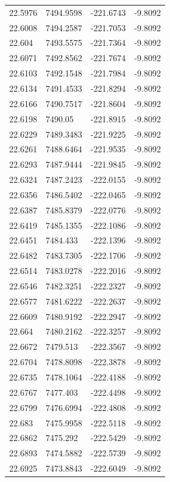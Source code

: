 \begin{table}[H]
\begin{tabular}{llll}
22.5976 & 7494.9598 & -221.6743 & -9.8092 \\
22.6008 & 7494.2587 & -221.7053 & -9.8092 \\
22.604 & 7493.5575 & -221.7364 & -9.8092 \\
22.6071 & 7492.8562 & -221.7674 & -9.8092 \\
22.6103 & 7492.1548 & -221.7984 & -9.8092 \\
22.6134 & 7491.4533 & -221.8294 & -9.8092 \\
22.6166 & 7490.7517 & -221.8604 & -9.8092 \\
22.6198 & 7490.05 & -221.8915 & -9.8092 \\
22.6229 & 7489.3483 & -221.9225 & -9.8092 \\
22.6261 & 7488.6464 & -221.9535 & -9.8092 \\
22.6293 & 7487.9444 & -221.9845 & -9.8092 \\
22.6324 & 7487.2423 & -222.0155 & -9.8092 \\
22.6356 & 7486.5402 & -222.0465 & -9.8092 \\
22.6387 & 7485.8379 & -222.0776 & -9.8092 \\
22.6419 & 7485.1355 & -222.1086 & -9.8092 \\
22.6451 & 7484.433 & -222.1396 & -9.8092 \\
22.6482 & 7483.7305 & -222.1706 & -9.8092 \\
22.6514 & 7483.0278 & -222.2016 & -9.8092 \\
22.6546 & 7482.3251 & -222.2327 & -9.8092 \\
22.6577 & 7481.6222 & -222.2637 & -9.8092 \\
22.6609 & 7480.9192 & -222.2947 & -9.8092 \\
22.664 & 7480.2162 & -222.3257 & -9.8092 \\
22.6672 & 7479.513 & -222.3567 & -9.8092 \\
22.6704 & 7478.8098 & -222.3878 & -9.8092 \\
22.6735 & 7478.1064 & -222.4188 & -9.8092 \\
22.6767 & 7477.403 & -222.4498 & -9.8092 \\
22.6799 & 7476.6994 & -222.4808 & -9.8092 \\
22.683 & 7475.9958 & -222.5118 & -9.8092 \\
22.6862 & 7475.292 & -222.5429 & -9.8092 \\
22.6893 & 7474.5882 & -222.5739 & -9.8092 \\
22.6925 & 7473.8843 & -222.6049 & -9.8092 \\

\end{tabular}
\end{table}
